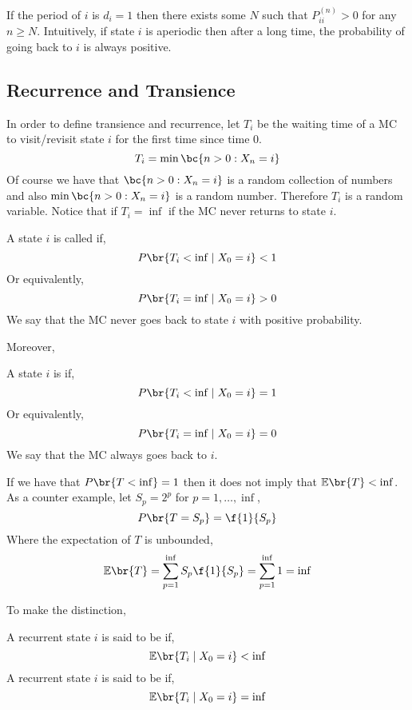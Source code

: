 \documentclass{article}
\newcommand{\Exp}{\mathbb{E}}
\begin{document}
\begin{remark}
    If the period of $i$ is $d_i = 1$ then there exists some $N$ such that $P_{ii}^{(n)} > 0$ for any $n \geq N$. Intuitively, if state $i$ is aperiodic then after a long time, the probability of going back to $i$ is always positive.
\end{remark}

\subsection{Recurrence and Transience}
In order to define transience and recurrence, let $T_i$ be the waiting time of a MC to visit/revisit state $i$ for the first time since time $0$.
\[ T_i = \min \bc{n > 0 : X_n = i} \]
Of course we have that $\bc{n > 0 : X_n = i}$ is a random collection of numbers and also $\min\bc{n > 0 : X_n = i}$ is a random number. Therefore $T_i$ is a random variable. Notice that if $T_i = \inf$ if the MC never returns to state $i$.
\begin{definition}
    A state $i$ is called  if,
    \[ P\br{T_i < \inf \mid X_0 = i} < 1 \]
    Or equivalently,
    \[ P\br{T_i = \inf \mid X_0 = i} > 0 \]
    We say that the MC never goes back to state $i$ with positive probability.
\end{definition}
Moreover,
\begin{definition}
    A state $i$ is  if,
    \[ P\br{T_i < \inf \mid X_0 = i} = 1 \]
    Or equivalently,
    \[ P\br{T_i = \inf \mid X_0 = i} = 0 \]
    We say that the MC always goes back to $i$.
\end{definition}
\begin{remark}
    If we have that $P\br{T < \inf} = 1$ then it does not imply that $\Exp\br{T} < \inf$. As a counter example, let $S_p = 2^{p}$ for $p = 1, \ldots, \inf$,
    \[ P\br{T = S_p} = \f{1}{S_p} \]
    Where the expectation of $T$ is unbounded,
    \[ \Exp\br{T} = \sum_{p=1}^{\inf} S_p \f{1}{S_p} = \sum_{p=1}^{\inf} 1 = \inf \]
\end{remark}
To make the distinction,
\begin{definition}
    A recurrent state $i$ is said to be  if,
    \[ \Exp\br{T_i \mid X_0 = i} < \inf \]
    A recurrent state $i$ is said to be  if,
    \[ \Exp\br{T_i \mid X_0 = i} = \inf \]
\end{definition}
\end{document}
